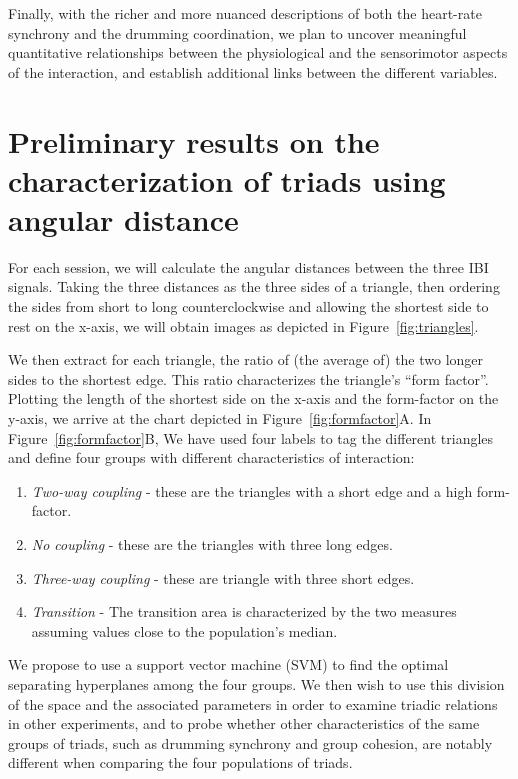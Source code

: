 \documentclass[a4paper, 11pt]{report}      %
\begin{document}
Finally, with the richer and more nuanced descriptions of both the heart-rate synchrony and the drumming coordination, we plan to uncover meaningful quantitative relationships between the physiological and the sensorimotor aspects of the interaction, and establish additional links between the different variables.  

\section{Preliminary results on the characterization of triads using angular distance}

For each session, we will calculate the angular distances between the three IBI signals. Taking the three distances as the three sides of a triangle, then ordering the sides from short to long counterclockwise and allowing the shortest side to rest on the x-axis, we will obtain images as depicted in 
Figure~\ref{fig:triangles}.

We then extract for each  triangle, the ratio of (the average of) the two longer sides to the shortest edge. This ratio characterizes the triangle's \enquote{form factor}. Plotting the length of the shortest side on the x-axis and the form-factor on the y-axis, we arrive at the chart depicted in Figure~\ref{fig:formfactor}A. In Figure~\ref{fig:formfactor}B, We have used four labels to tag the different triangles and define four groups with different characteristics of interaction:
\begin{enumerate}
    \item \emph{Two-way coupling} - these are the triangles with a short edge and a high form-factor.
    \item \emph{No coupling} - these are the triangles with three long edges.
    \item \emph{Three-way coupling} - these are triangle with three short edges.
    \item \emph{Transition} - The transition area is characterized by the two measures assuming values close to the population's median.
\end{enumerate}
We propose to use a support vector machine (SVM) to find the optimal separating hyperplanes among the four groups. We then wish to use this division of the space and the associated parameters in order to examine triadic relations in other experiments, and to probe whether other characteristics of the same groups of triads, such as drumming synchrony and group cohesion, are notably different when comparing the four populations of triads.   
\end{document}
